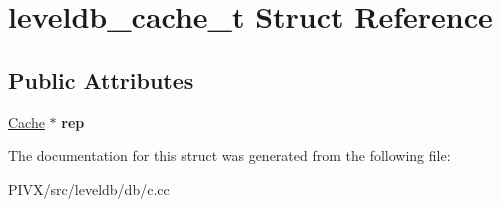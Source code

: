 \hypertarget{structleveldb__cache__t}{}\section{leveldb\+\_\+cache\+\_\+t Struct Reference}
\label{structleveldb__cache__t}
\subsection*{Public Attributes}
\begin{DoxyCompactItemize}
\item 
\mbox{\label{structleveldb__cache__t_a78f74e9a86ea86296e562fe990751a4a}} 
\mbox{\hyperlink{classleveldb_1_1_cache}{Cache}} $\ast$ {\bfseries rep}
\end{DoxyCompactItemize}


The documentation for this struct was generated from the following file\+:\begin{DoxyCompactItemize}
\item 
P\+I\+V\+X/src/leveldb/db/c.\+cc\end{DoxyCompactItemize}
